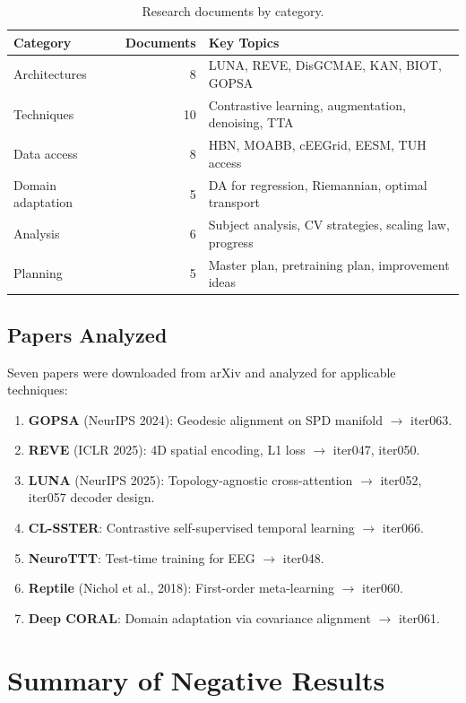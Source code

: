 \documentclass[11pt,a4paper]{article}
\begin{document}
\begin{table}[H]
\centering
\small
\caption{Research documents by category.}
\begin{tabular}{lrl}
\toprule
Category & Documents & Key Topics \\
\midrule
Architectures & 8 & LUNA, REVE, DisGCMAE, KAN, BIOT, GOPSA \\
Techniques & 10 & Contrastive learning, augmentation, denoising, TTA \\
Data access & 8 & HBN, MOABB, cEEGrid, EESM, TUH access \\
Domain adaptation & 5 & DA for regression, Riemannian, optimal transport \\
Analysis & 6 & Subject analysis, CV strategies, scaling law, progress \\
Planning & 5 & Master plan, pretraining plan, improvement ideas \\
\bottomrule
\end{tabular}
\end{table}

\subsection{Papers Analyzed}

Seven papers were downloaded from arXiv and analyzed for applicable
techniques:

\begin{enumerate}
  \item \textbf{GOPSA} (NeurIPS 2024): Geodesic alignment on SPD manifold
    $\to$ iter063.
  \item \textbf{REVE} (ICLR 2025): 4D spatial encoding, L1 loss
    $\to$ iter047, iter050.
  \item \textbf{LUNA} (NeurIPS 2025): Topology-agnostic cross-attention
    $\to$ iter052, iter057 decoder design.
  \item \textbf{CL-SSTER}: Contrastive self-supervised temporal learning
    $\to$ iter066.
  \item \textbf{NeuroTTT}: Test-time training for EEG
    $\to$ iter048.
  \item \textbf{Reptile} (Nichol et al., 2018): First-order meta-learning
    $\to$ iter060.
  \item \textbf{Deep CORAL}: Domain adaptation via covariance alignment
    $\to$ iter061.
\end{enumerate}

\section{Summary of Negative Results}
\label{sec:negative}
\end{document}
